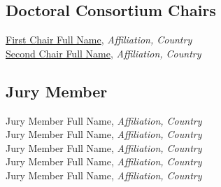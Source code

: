 
\subsection{Doctoral Consortium Chairs}
\href{https://orcid.org/0000-0001-2345-6789}{First Chair Full Name}, \emph{Affiliation, Country}\\
\href{https://orcid.org/0000-0001-2345-6789}{Second Chair Full Name}, \emph{Affiliation, Country}\\


\subsection{Jury Member}
Jury Member Full Name, \emph{Affiliation, Country}\\
Jury Member Full Name, \emph{Affiliation, Country}\\
Jury Member Full Name, \emph{Affiliation, Country}\\
Jury Member Full Name, \emph{Affiliation, Country}\\
Jury Member Full Name, \emph{Affiliation, Country}\\
